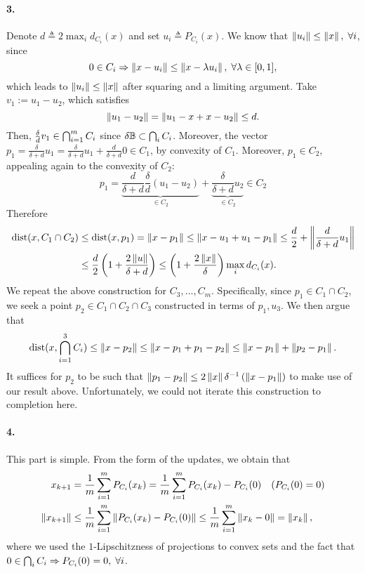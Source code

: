 \documentclass[10pt]{article}
\begin{document}
\paragraph{3.}
Denote $d \triangleq 2 \max_i d_{C_i}(x)$ and set $u_i \triangleq P_{C_i}(x)$.
We know that $\left \| u_i \right \| \leq \left \| x \right \|, \; \forall i$, since
\[
    0 \in C_i \Rightarrow
    \left \| x - u_i \right \| \leq \left \| x - \lambda u_i \right \|, \; \forall \lambda \in [0, 1],
\]
which leads to $\left \| u_i \right \| \leq \left \| x \right \|$ after squaring and a limiting
argument. Take $v_1 := u_1 - u_2$, which satisfies
\[
    \left \| u_1 - u_2 \right \| = \left \| u_1 - x + x - u_2 \right \| \leq d.
\]
Then, $\frac{\delta}{d} v_1 \in \operatorname*{\bigcap}_{i=1}^m C_i$ since $\delta \mathbb{B}
\subset \operatorname*{\bigcap}_i C_i$. Moreover, the vector $p_1 = \frac{\delta}{\delta + d} u_1
= \frac{\delta}{\delta + d} u_1 + \frac{d}{\delta + d} 0 \in C_1$, by convexity
of $C_1$. Moreover, $p_1 \in C_2$, appealing again to the convexity of $C_2$:
\[
    p_1 = \underbrace{\frac{d}{\delta + d} \frac{\delta}{d} (u_1 - u_2)}_{\in
    C_2} + \underbrace{\frac{\delta}{\delta + d} u_2}_{\in C_2} \in C_2
\]
Therefore
\begin{align*}
    \mathrm{dist}(x, C_1 \cap C_2) &\leq \mathrm{dist}(x, p_1)
    = \left \| x - p_1 \right \| \leq \left \| x - u_1 + u_1 - p_1 \right \| \leq \frac{d}{2}
    + \left \| \frac{d}{\delta + d} u_1 \right \| \\
    &\leq \frac{d}{2} \left(1 + \frac{2 \left \| u \right \|}{\delta + d}\right)
     \leq \left(1 + \frac{2 \left \| x \right \|}{\delta}\right) \max_i d_{C_i}(x).
\end{align*}
We repeat the above construction for $C_3, \dots, C_m$. Specifically, since
$p_1 \in C_1 \cap C_2$, we seek a point $p_2 \in C_1 \cap C_2 \cap C_3$
constructed in terms of $p_1, u_3$. We then argue that
\[
    \mathrm{dist}(x, \operatorname*{\bigcap}_{i=1}^3 C_i) \leq \left \| x - p_2 \right \| \leq
    \left \| x - p_1 + p_1 - p_2 \right \| \leq \left \| x - p_1 \right \| + \left \| p_2 - p_1 \right \|.
\]
It suffices for $p_2$ to be such that $\left \| p_1 - p_2 \right \| \leq 2 \left \| x \right \|
\delta^{-1} \left( \left \| x - p_1 \right \| \right)$ to make use of our result above.
Unfortunately, we could not iterate this construction to completion here.

\paragraph{4.}
This part is simple. From the form of the updates, we obtain that
\begin{align*}
    x_{k+1} &= \frac{1}{m} \sum_{i=1}^m P_{C_i}(x_k) =
        \frac{1}{m} \sum_{i=1}^m P_{C_i}(x_k) - P_{C_i}(0) \quad (P_{C_i}(0) =
        0) \\
    \left \| x_{k+1} \right \| &\leq \frac{1}{m} \sum_{i=1}^m \left \| P_{C_i}(x_k) -
    P_{C_i}(0) \right \| \leq \frac{1}{m} \sum_{i=1}^m \left \| x_k - 0 \right \| = \left \| x_k \right \|,
\end{align*}
where we used the $1$-Lipschitzness of projections to convex sets and the fact
that $0 \in \operatorname*{\bigcap}_i C_i \Rightarrow P_{C_i}(0) = 0, \; \forall i$.
\end{document}
